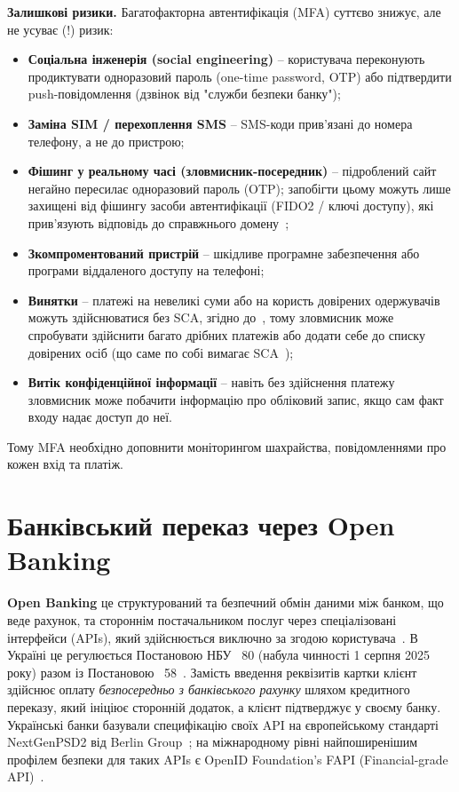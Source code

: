 \textbf{Залишкові ризики.} Багатофакторна автентифікація (MFA) суттєво знижує, але не усуває (!) ризик:
\begin{itemize}[noitemsep]
    \item \textbf{Соціальна інженерія (social engineering)} -- користувача переконують продиктувати одноразовий 
        пароль (one-time password, OTP) або підтвердити push-повідомлення (дзвінок від "служби безпеки банку"{});
    \item \textbf{Заміна SIM / перехоплення SMS} -- SMS-коди прив'язані до номера телефону, а не до пристрою;
    \item \textbf{Фішинг у реальному часі (зловмисник-посередник)} -- підроблений сайт негайно пересилає 
        одноразовий пароль (OTP); запобігти цьому можуть лише захищені від фішингу засоби автентифікації 
        (FIDO2 / ключі доступу), які прив'язують відповідь до справжнього домену~\cite{nist_80063b4};
    \item \textbf{Зкомпроментований пристрій} -- шкідливе програмне забезпечення або програми віддаленого 
        доступу на телефоні;
    \item \textbf{Винятки} -- платежі на невеликі суми або на користь довірених одержувачів можуть здійснюватися 
        без SCA, згідно до~\cite[п.~37--39]{nbu58}, тому зловмисник може спробувати здійснити багато дрібних 
        платежів або додати себе до списку довірених осіб (що саме по собі вимагає SCA~\cite[п.~38]{nbu58});
    \item \textbf{Витік конфіденційної інформації} -- навіть без здійснення платежу зловмисник може побачити 
        інформацію про обліковий запис, якщо сам факт входу надає доступ до неї.
\end{itemize}
Тому MFA необхідно доповнити моніторингом шахрайства, повідомленнями про кожен вхід та платіж.

\section{Банківський переказ через Open Banking}
\label{sec:openbanking}


\textbf{Open Banking} це структурований та безпечний обмін даними між банком, що веде рахунок, та стороннім постачальником 
послуг через спеціалізовані інтерфейси (APIs), який здійснюється виключно за згодою користувача~\cite[п.~2]{nbu80}. 
В Україні це регулюється Постановою НБУ \No~80 (набула чинності 1 серпня 2025 року) разом із Постановою \No~58~\cite{nbu80, nbu58}. 
Замість введення реквізитів картки клієнт здійснює оплату \emph{безпосередньо з банківського рахунку} шляхом кредитного 
переказу, який ініціює сторонній додаток, а клієнт підтверджує у своєму банку. Українські банки базували специфікацію 
своїх API на європейському стандарті NextGenPSD2 від Berlin Group~\cite{mind_ob_berlin}; на міжнародному рівні найпоширенішим 
профілем безпеки для таких APIs є OpenID Foundation's FAPI (Financial-grade API)~\cite{fapi2}.

